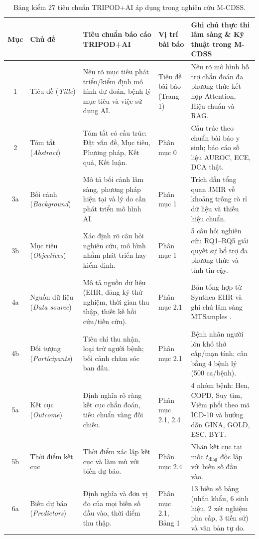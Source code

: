 \begin{table}[htbp]
\centering
\caption{Bảng kiểm 27 tiêu chuẩn TRIPOD+AI áp dụng trong nghiên cứu M-CDSS.}
\label{tab:tripod_ai_checklist}
\tiny
\begin{tabularx}{\textwidth}{@{}cp{2.4cm}p{4.2cm}p{1.8cm}X@{}}
\toprule
\textbf{Mục} & \textbf{Chủ đề} & \textbf{Tiêu chuẩn báo cáo TRIPOD+AI} & \textbf{Vị trí bài báo} & \textbf{Ghi chú thực thi lâm sàng \& Kỹ thuật trong M-CDSS} \\
\midrule
1 & Tiêu đề (\textit{Title}) & Nêu rõ mục tiêu phát triển/kiểm định mô hình dự đoán, bệnh lý mục tiêu và việc sử dụng AI. & Tiêu đề bài báo (Trang 1) & Nêu rõ mô hình hỗ trợ chẩn đoán đa phương thức kết hợp Attention, Hiệu chuẩn và RAG. \\
2 & Tóm tắt (\textit{Abstract}) & Tóm tắt có cấu trúc: Đặt vấn đề, Mục tiêu, Phương pháp, Kết quả, Kết luận. & Phân mục 0 & Cấu trúc theo chuẩn bài báo y sinh; báo cáo số liệu AUROC, ECE, DCA thật. \\
3a & Bối cảnh (\textit{Background}) & Mô tả bối cảnh lâm sàng, phương pháp hiện tại và lý do cần phát triển mô hình AI. & Phân mục 1 & Trích dẫn tổng quan JMIR \cite{hunik2024diagnostic} về khoảng trống rò rỉ dữ liệu và thiếu hiệu chuẩn. \\
3b & Mục tiêu (\textit{Objectives}) & Xác định rõ câu hỏi nghiên cứu, mô hình nhằm phát triển hay kiểm định. & Phân mục 1 & 5 câu hỏi nghiên cứu RQ1--RQ5 giải quyết sự bổ trợ đa phương thức và tính tin cậy. \\
4a & Nguồn dữ liệu (\textit{Data source}) & Mô tả nguồn dữ liệu (EHR, đăng ký thử nghiệm, thời gian thu thập, thiết kế hồi cứu/tiến cứu). & Phân mục 2.1 & Bán tổng hợp từ Synthea EHR \cite{walonoski2018synthea} và ghi chú lâm sàng MTSamples \cite{mtsamples2012}. \\
4b & Đối tượng (\textit{Participants}) & Tiêu chí thu nhận, loại trừ người bệnh; bối cảnh chăm sóc ban đầu. & Phân mục 2.1 & Bệnh nhân người lớn khó thở cấp/mạn tính; cân bằng 4 bệnh lý (500 ca/bệnh). \\
5a & Kết cục (\textit{Outcome}) & Định nghĩa rõ ràng kết cục chẩn đoán, tiêu chuẩn vàng đối chiếu. & Phân mục 2.1, 2.4 & 4 nhóm bệnh: Hen, COPD, Suy tim, Viêm phổi theo mã ICD-10 và hướng dẫn GINA, GOLD, ESC, BYT. \\
5b & Thời điểm kết cục & Thời điểm xác lập kết cục và làm mù với biến dự báo. & Phân mục 2.4 & Nhãn kết cục tại mốc $t_{\text{diag}}$ độc lập với biến số đầu vào. \\
6a & Biến dự báo (\textit{Predictors}) & Định nghĩa và đơn vị đo của mọi biến số đầu vào, thời điểm thu thập. & Phân mục 2.1, Bảng 1 & 13 biến số bảng (nhân khẩu, 6 sinh hiệu, 2 xét nghiệm pha cấp, 3 tiền sử) và văn bản tự do. \\

\end{tabularx}
\end{table}
